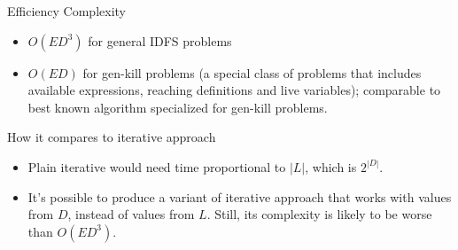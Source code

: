 \begin{frame}{Efficiency}
    Complexity
\begin{itemize}
    \item $O(ED^3)$ for general IDFS problems
    \item $O(ED)$ for gen-kill problems (a special class of problems that includes available expressions, reaching definitions and live variables); comparable to best known algorithm specialized for gen-kill problems.
\end{itemize}

How it compares to iterative approach
\begin{itemize}
    \item Plain iterative would need time proportional to $|L|$, which is $2^{|D|}$.
    \item It's possible to produce a variant of iterative approach that works with values from $D$, instead of values from $L$. Still, its complexity is likely to be worse than $O(ED^3)$.
\end{itemize}
\end{frame}